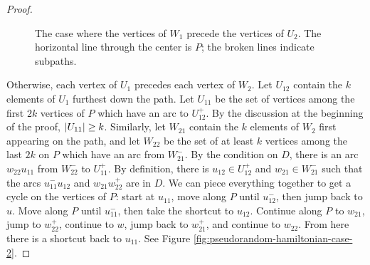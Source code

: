 \documentclass[11pt,english]{article}
\theoremstyle{plain}
\theoremstyle{definition}
\theoremstyle{definition}
\theoremstyle{plain}
\theoremstyle{plain}
\theoremstyle{plain}
\theoremstyle{plain}
\theoremstyle{remark}
\theoremstyle{remark}
\let\originalleft\left
\let\originalright\right
\renewcommand{\left}{\mathopen{}\mathclose\bgroup\originalleft}
\renewcommand{\right}{\aftergroup\egroup\originalright}
\begin{document}
\begin{proof}
\begin{figure}[H]
\begin{center}
\hspace{0.5cm}
\end{center}

\protect\caption{\label{fig:pseudorandom-hamiltonian-case-1}The case where the vertices
of $W_{1}$ precede the vertices of $U_{2}$. The horizontal line
through the center is $P$; the broken lines indicate subpaths.}
\end{figure}


Otherwise, each vertex of $U_{1}$ precedes each vertex of $W_{2}$.
Let $U_{12}$ contain the $k$ elements of $U_{1}$ furthest down
the path. Let $U_{11}$ be the set of vertices among the first $2k$
vertices of $P$ which have an arc to $U_{12}^{+}$. By the discussion
at the beginning of the proof, $\left|U_{11}\right|\ge k$. Similarly,
let $W_{21}$ contain the $k$ elements of $W_{2}$ first appearing
on the path, and let $W_{22}$ be the set of at least $k$ vertices
among the last $2k$ on $P$ which have an arc from $W_{21}^{-}$.
By the condition on $D$, there is an arc $w_{22}u_{11}$ from $W_{22}^{-}$
to $U_{11}^{+}$. By definition, there is $u_{12}\in U_{12}^{+}$
and $w_{21}\in W_{21}^{-}$ such that the arcs $u_{11}^{-}u_{12}$
and $w_{21}w_{22}^{+}$ are in $D$. We can piece everything together
to get a cycle on the vertices of $P$: start at $u_{11}$, move along
$P$ until $u_{12}^{-}$, then jump back to $u$. Move along $P$
until $u_{11}^{-}$, then take the shortcut to $u_{12}$. Continue
along $P$ to $w_{21}$, jump to $w_{22}^{+}$, continue to $w$,
jump back to $w_{21}^{+}$, and continue to $w_{22}$. From here there
is a shortcut back to $u_{11}$. See Figure \ref{fig:pseudorandom-hamiltonian-case-2}.


\end{proof}
\end{document}
